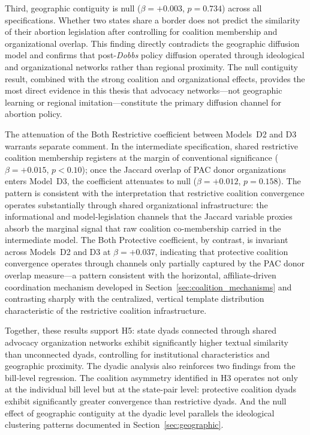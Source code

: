 Third, geographic contiguity is null ($\beta = +0.003$, $p = 0.734$) across all specifications. Whether two states share a border does not predict the similarity of their abortion legislation after controlling for coalition membership and organizational overlap. This finding directly contradicts the geographic diffusion model \parencite{walkerDiffusionInnovationsAmerican1969} and confirms that post-\emph{Dobbs} policy diffusion operated through ideological and organizational networks rather than regional proximity. The null contiguity result, combined with the strong coalition and organizational effects, provides the most direct evidence in this thesis that advocacy networks---not geographic learning or regional imitation---constitute the primary diffusion channel for abortion policy.

The attenuation of the Both Restrictive coefficient between Models~D2 and D3 warrants separate comment. In the intermediate specification, shared restrictive coalition membership registers at the margin of conventional significance ($\beta = +0.015$, $p < 0.10$); once the Jaccard overlap of PAC donor organizations enters Model~D3, the coefficient attenuates to null ($\beta = +0.012$, $p = 0.158$). The pattern is consistent with the interpretation that restrictive coalition convergence operates substantially through shared organizational infrastructure: the informational and model-legislation channels that the Jaccard variable proxies absorb the marginal signal that raw coalition co-membership carried in the intermediate model. The Both Protective coefficient, by contrast, is invariant across Models~D2 and D3 at $\beta = +0.037$, indicating that protective coalition convergence operates through channels only partially captured by the PAC donor overlap measure---a pattern consistent with the horizontal, affiliate-driven coordination mechanism developed in Section~\ref{sec:coalition_mechanisms} and contrasting sharply with the centralized, vertical template distribution characteristic of the restrictive coalition infrastructure.

Together, these results support H5: state dyads connected through shared advocacy organization networks exhibit significantly higher textual similarity than unconnected dyads, controlling for institutional characteristics and geographic proximity. The dyadic analysis also reinforces two findings from the bill-level regression. The coalition asymmetry identified in H3 operates not only at the individual bill level but at the state-pair level: protective coalition dyads exhibit significantly greater convergence than restrictive dyads. And the null effect of geographic contiguity at the dyadic level parallels the ideological clustering patterns documented in Section~\ref{sec:geographic}.

